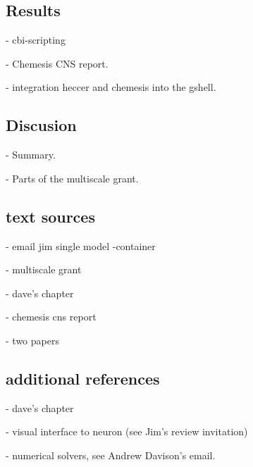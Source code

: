\documentclass[12pt]{article}
\begin{document}
\subsection*{Results}

- cbi-scripting

- Chemesis CNS report.

- integration heccer and chemesis into the gshell.


\subsection*{Discusion}

- Summary.

- Parts of the multiscale grant.


\subsection*{text sources}

- email jim single model -container

- multiscale grant

- dave's chapter

- chemesis cns report

- two papers


\subsection*{additional references}

- dave's chapter

- visual interface to neuron (see Jim's review invitation)

- numerical solvers, see Andrew Davison's email.





\end{document}
